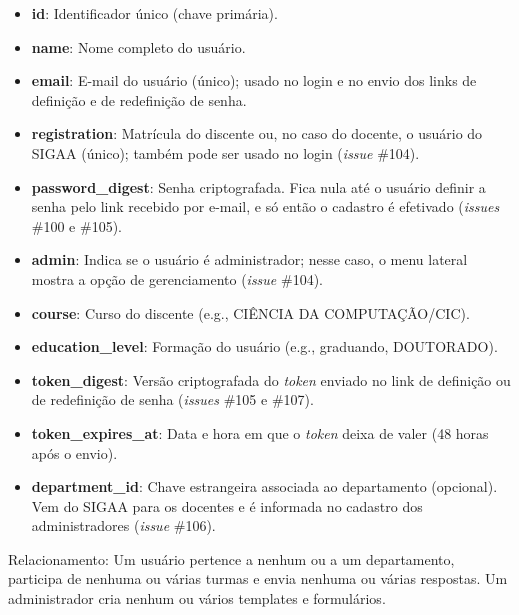 \documentclass[a4paper,12pt]{article}
\begin{document}
\begin{itemize}

    \item \textbf{id}: Identificador único (chave primária).

    \item \textbf{name}: Nome completo do usuário.

    \item \textbf{email}: E-mail do usuário (único); usado no login e no envio dos links de definição e de redefinição de senha.

    \item \textbf{registration}: Matrícula do discente ou, no caso do docente, o usuário do SIGAA (único); também pode ser usado no login (\textit{issue} \#104).

    \item \textbf{password\_digest}: Senha criptografada. Fica nula até o usuário definir a senha pelo link recebido por e-mail, e só então o cadastro é efetivado (\textit{issues} \#100 e \#105).

    \item \textbf{admin}: Indica se o usuário é administrador; nesse caso, o menu lateral mostra a opção de gerenciamento (\textit{issue} \#104).

    \item \textbf{course}: Curso do discente (e.g., CIÊNCIA DA COMPUTAÇÃO/CIC).

    \item \textbf{education\_level}: Formação do usuário (e.g., graduando, DOUTORADO).

    \item \textbf{token\_digest}: Versão criptografada do \textit{token} enviado no link de definição ou de redefinição de senha (\textit{issues} \#105 e \#107).

    \item \textbf{token\_expires\_at}: Data e hora em que o \textit{token} deixa de valer (48 horas após o envio).

    \item \textbf{department\_id}: Chave estrangeira associada ao departamento (opcional). Vem do SIGAA para os docentes e é informada no cadastro dos administradores (\textit{issue} \#106).

\end{itemize}

Relacionamento: Um usuário pertence a nenhum ou a um departamento, participa de nenhuma ou várias turmas e envia nenhuma ou várias respostas. Um administrador cria nenhum ou vários templates e formulários.
\end{document}
